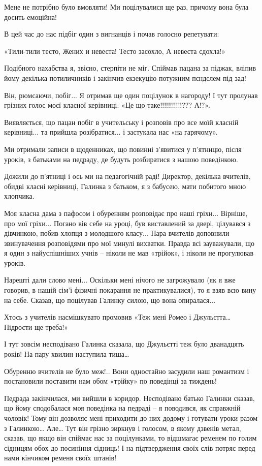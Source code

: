 Мене не потрібно було вмовляти! Ми поцілувалися ще раз, причому вона була
досить емоційна!

В цей час до нас підбіг один з вигнанців і почав голосно репетувати:

\obeycr
«Тили-тили тесто,
Жених и невеста!
Тесто засохло,
А невеста сдохла!» 
\restorecr

Подібного нахабства я, звісно, стерпіти не міг. Спіймав пацана за піджак,
вліпив йому декілька потиличників і закінчив екзекуцію потужним пєндєлем під
зад!

Він, рюмсаючи, побіг... Я отримав ще один поцілунок в нагороду! І тут пролунав
грізних голос моєї класної керівниці: «Це що таке!!!!!!!!!!!??? А!?». 

Виявляється, що пацан побіг в учительську і розповів про все моїй класній
керівниці... та прийшла розібратися... і застукала нас «на гарячому».

Ми отримали записи в щоденниках, що повинні з’явитися у п’ятницю, після уроків,
з батьками на педраду, де будуть розбиратися з нашою поведінкою.

Дожили до п’ятниці і ось ми на педагогічній раді! Директор, декілька вчителів,
обидві класні керівниці, Галинка з батьком, я з бабусею, мати побитого мною
хлопчика.

Моя класна дама з пафосом і обуренням розповідає про наші гріхи... Вірніше, про
мої гріхи... Погано вів себе на уроці, був виставлений за двері, цілувався з
дівчинкою, побив хлопця з молодшого класу... Пара вчителів доповнили звинувачення
розповідями про мої минулі вихватки. Правда всі зауважували, що я один з
найуспішніших учнів – ніколи не мав «трійок», і ніколи не прогулював уроків. 

Нарешті дали слово мені... Оскільки мені нічого не загрожувало (як я вже говорив,
в нашій сім’ї фізичні покарання не практикувалися), то я взяв всю вину на себе.
Сказав, що поцілував Галинку силою, що вона опиралася...

Хтось з учителів насмішкувато промовив «Теж мені Ромео і Джульєтта… Підрости ще
треба!»

І тут зовсім несподівано Галинка сказала, що Джульєтті теж було дванадцять
років! На пару хвилин наступила тиша…

Обуренню вчителів не було меж!.. Вони одностайно засудили наш романтизм і
постановили поставити нам обом «трійку» по поведінці за тиждень!

Педрада закінчилася, ми вийшли в коридор. Несподівано батько Галинки сказав, що
йому сподобалася моя поведінка на педраді – я поводився, як справжній чоловік!
Тому він дозволяє мені приходити до них додому і готувати уроки разом з
Галинкою… Але… Тут він грізно зиркнув і голосом, в якому дзвенів метал, сказав,
що якщо він спіймає нас за поцілунками, то відшмагає ременем по голим сідницям
обох до посиніння сідниць! І на підтвердження своїх слів потряс перед нами
кінчиком ременя своїх штанів!

